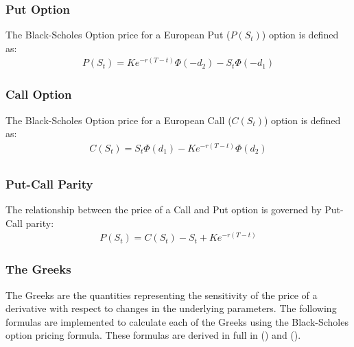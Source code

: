 \documentclass[10pt]{article}
\begin{document}
        \subsubsection{Put Option}

        The Black-Scholes Option price for a European Put ($P(S_t)$) option is defined as:
        \begin{gather*}
            P(S_t) = K e^{-r(T-t)} \Phi(-d_2) - S_t \Phi(-d_1)
        \end{gather*}

        


        \subsubsection{Call Option}

        The Black-Scholes Option price for a European Call ($C(S_t)$) option is defined as:
        \begin{gather*}
            C(S_t) = S_t \Phi(d_1) - K e^{-r(T-t)} \Phi(d_2) \\
        \end{gather*}

        


        \subsubsection{Put-Call Parity}

        The relationship between the price of a Call and Put option is governed by Put-Call parity:
        \begin{gather*}
            P(S_t) = C(S_t) - S_t + K e^{-r(T-t)}
        \end{gather*}
    
        


        \subsubsection{The Greeks}

        The Greeks are the quantities representing the sensitivity of the price of a derivative with respect to changes in the underlying parameters. The following formulas are implemented to calculate each of the Greeks using the Black-Scholes option pricing formula. These formulas are derived in full in (\cite{Stefanica2011}) and (\cite{Weerawarana2016}).
\end{document}

